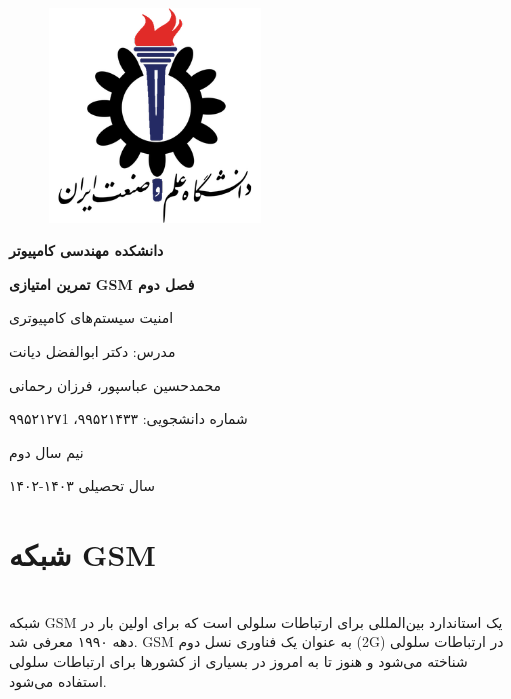 \documentclass{article}
\begin{document}
\begin{titlepage}
    \centering
    \begin{figure}[ht]
        \centering
        \includegraphics[width=0.5\textwidth]{iust.png}
    \end{figure}
    \vspace{1cm}
    {\scshape\Huge \textbf{دانشکده مهندسی کامپیوتر} \par}
    \vspace{1cm}
    {\huge\bfseries تمرین امتیازی GSM فصل دوم \par}
    \vspace{1cm}
    {\Large امنیت سیستم‌های کامپیوتری \par}
    \vspace{1cm}
	{\LARGE  مدرس: دکتر ابوالفضل دیانت\par}
    \vspace{1cm}
    {\LARGE  محمدحسین عباسپور، فرزان رحمانی \par}
    \vspace{1cm}
    {\LARGE شماره دانشجویی: ۹۹۵۲۱۴۳۳، ۹۹۵۲۱۲۷1 \par}
    \vspace{1.22cm}
    {\large نیم سال دوم \par}
    {\large سال تحصیلی ۱۴۰۳-۱۴۰۲ \par}
\end{titlepage}
\newpage
\doublespacing
\singlespacing
\newpage
\section{شبکه GSM}
\leavevmode
\\
شبکه GSM یک استاندارد بین‌المللی برای ارتباطات سلولی است که برای اولین بار در دهه ۱۹۹۰ معرفی شد. GSM به عنوان یک فناوری نسل دوم (2G) در ارتباطات سلولی شناخته می‌شود و هنوز تا به امروز در بسیاری از کشورها برای ارتباطات سلولی استفاده می‌شود.
\\
\end{document}
